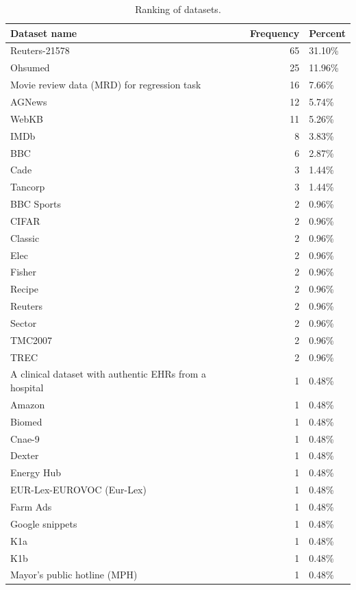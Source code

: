 \documentclass[
]{article}
\begin{document}
\begin{table}

\caption{\label{tab:qaDataDis3}Ranking of datasets.}
\centering
\begin{tabular}[t]{l|r|l}
\hline
Dataset name & Frequency & Percent\\
\hline
Reuters-21578 & 65 & 31.10\%\\
\hline
Ohsumed & 25 & 11.96\%\\
\hline
Movie review data (MRD) for regression task & 16 & 7.66\%\\
\hline
AGNews & 12 & 5.74\%\\
\hline
WebKB & 11 & 5.26\%\\
\hline
IMDb & 8 & 3.83\%\\
\hline
BBC & 6 & 2.87\%\\
\hline
Cade & 3 & 1.44\%\\
\hline
Tancorp & 3 & 1.44\%\\
\hline
BBC Sports & 2 & 0.96\%\\
\hline
CIFAR & 2 & 0.96\%\\
\hline
Classic & 2 & 0.96\%\\
\hline
Elec & 2 & 0.96\%\\
\hline
Fisher & 2 & 0.96\%\\
\hline
Recipe & 2 & 0.96\%\\
\hline
Reuters & 2 & 0.96\%\\
\hline
Sector & 2 & 0.96\%\\
\hline
TMC2007 & 2 & 0.96\%\\
\hline
TREC & 2 & 0.96\%\\
\hline
A clinical dataset with authentic EHRs from a hospital & 1 & 0.48\%\\
\hline
Amazon & 1 & 0.48\%\\
\hline
Biomed & 1 & 0.48\%\\
\hline
Cnae-9 & 1 & 0.48\%\\
\hline
Dexter & 1 & 0.48\%\\
\hline
Energy Hub & 1 & 0.48\%\\
\hline
EUR-Lex-EUROVOC (Eur-Lex) & 1 & 0.48\%\\
\hline
Farm Ads & 1 & 0.48\%\\
\hline
Google snippets & 1 & 0.48\%\\
\hline
K1a & 1 & 0.48\%\\
\hline
K1b & 1 & 0.48\%\\
\hline
Mayor’s public hotline (MPH) & 1 & 0.48\%\\
\hline

\end{tabular}
\end{table}
\end{document}

